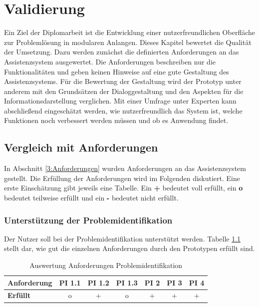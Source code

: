 \chapter{Validierung}
\label{Validierung}

Ein Ziel der Diplomarbeit ist die Entwicklung einer nutzerfreundlichen Oberfläche zur Problemlösung in modularen Anlangen. Dieses Kapitel bewertet die Qualität der Umsetzung. Dazu werden zunächst die definierten Anforderungen an das Assistenzsystem ausgewertet. Die Anforderungen beschreiben nur die Funktionalitäten und geben keinen Hinweise auf eine gute Gestaltung des Assistenzsystems. Für die Bewertung der Gestaltung wird der Prototyp unter anderem mit den Grundsätzen der Dialoggestaltung und den Aspekten für die Informationsdarstellung verglichen. Mit einer Umfrage unter Experten kann abschließend eingeschätzt werden, wie nutzerfreundlich das System ist, welche Funktionen noch verbessert werden müssen   und ob es Anwendung findet.

\section{Vergleich mit Anforderungen}
In Abschnitt \ref{3:Anforderungen} wurden Anforderungen an das Assistenzsystem gestellt. Die Erfüllung der Anforderungen wird im Folgenden diskutiert. Eine erste Einschätzung gibt jeweils eine Tabelle. Ein \textbf{+} bedeutet voll erfüllt, ein \textbf{o} bedeutet teilweise erfüllt und ein \textbf{-} bedeutet nicht erfüllt.

\subsection{Unterstützung der Problemidentifikation}
Der Nutzer soll bei der Problemidentifikation unterstützt werden. Tabelle \ref{tab:Anforderungen-Problemidentifikation} stellt dar, wie gut die einzelnen Anforderungen durch den Prototypen erfüllt sind.
\begin{table}[htbp]
\caption{Auswertung Anforderungen Problemidentifikation}
\centering
\begin{tabular}{l|c|c|c|c|c|c}
\textbf{Anforderung} & PI 1.1 & PI 1.2 & PI 1.3 & PI 2 & PI 3 & PI 4 \\
\hline
\textbf{Erfüllt} & o & + & o & + & + & + \\
\end{tabular}
\label{tab:Anforderungen-Problemidentifikation}
\end{table}

